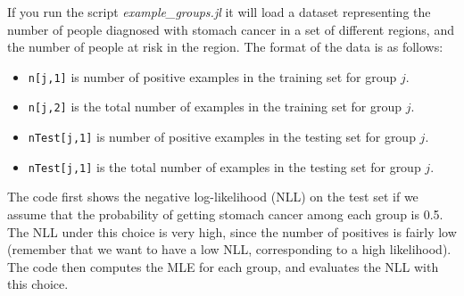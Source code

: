 \documentclass{article}
\def\items#1{\begin{itemize}#1\end{itemize}}
\begin{document}
If you run the script \emph{example\_groups.jl} it will load a dataset representing the number of people diagnosed with stomach cancer in a set of different regions, and the number of people at risk in the region. The format of the data is as follows:
\items{
\item \texttt{n[j,1]} is number of positive examples in the training set for group $j$.
\item \texttt{n[j,2]} is the total number of examples in the training set for group $j$.
\item \texttt{nTest[j,1]} is number of positive examples in the testing set for group $j$.
\item \texttt{nTest[j,1]} is the total number of examples in the testing set for group $j$.
}
The code first shows the negative log-likelihood (NLL) on the test set if we assume that the probability of getting stomach cancer among each group is 0.5. The NLL under this choice is very high, since the number of positives is fairly low (remember that we want to have a low NLL, corresponding to a high likelihood). The code then computes the MLE for each group, and evaluates the NLL with this choice.
\end{document}
